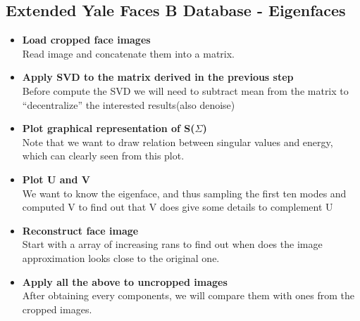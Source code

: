 \documentclass[11pt,a4paper]{article}
\numberwithin{equation}{subsection}
\begin{document}
\subsection{Extended Yale Faces B Database - Eigenfaces}
\begin{itemize}
\item[] \textbf{Load cropped face images}\\ 
Read image and concatenate them into a matrix.
\item[] \textbf{Apply SVD to the matrix derived in the previous step}\\
Before compute the SVD we will need to subtract mean from the matrix to ``decentralize'' the interested results(also denoise)
\item[] \textbf{Plot graphical representation of S($\Sigma$)}\\ Note that we want to draw relation between singular values and energy, which can clearly seen from this plot.
\item[] \textbf{Plot U and V}\\
We want to know the eigenface, and thus sampling the first ten modes and computed V to find out that V does give some details to complement U
\item[] \textbf{Reconstruct face image}\\
Start with a array of increasing rans to find out when does the image approximation looks close to the original one.
\item[] \textbf{Apply all the above to uncropped images}\\
After obtaining every components, we will compare them with ones from the cropped images.
\end{itemize}
\end{document}
